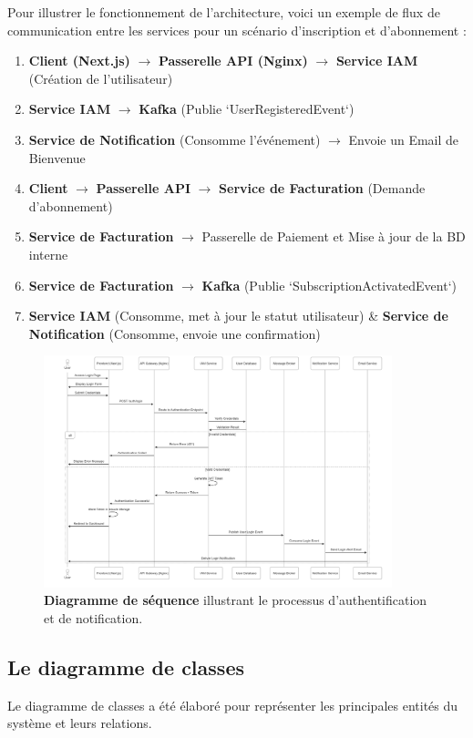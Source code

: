 Pour illustrer le fonctionnement de l'architecture, voici un exemple de flux de communication entre les services pour un scénario d'inscription et d'abonnement :
\begin{enumerate}
  \item \textbf{Client (Next.js)} $\rightarrow$ \textbf{Passerelle API (Nginx)} $\rightarrow$ \textbf{Service IAM} (Création de l'utilisateur)
  \item \textbf{Service IAM} $\rightarrow$ \textbf{Kafka} (Publie `UserRegisteredEvent`)
  \item \textbf{Service de Notification} (Consomme l'événement) $\rightarrow$ Envoie un Email de Bienvenue
  \item \textbf{Client} $\rightarrow$ \textbf{Passerelle API} $\rightarrow$ \textbf{Service de Facturation} (Demande d'abonnement)
  \item \textbf{Service de Facturation} $\rightarrow$ Passerelle de Paiement et Mise à jour de la BD interne
  \item \textbf{Service de Facturation} $\rightarrow$ \textbf{Kafka} (Publie `SubscriptionActivatedEvent`)
  \item \textbf{Service IAM} (Consomme, met à jour le statut utilisateur) \& \textbf{Service de Notification} (Consomme, envoie une confirmation)
\end{enumerate}

\begin{figure}[p]
  \centering
  \includegraphics[width=0.9\textwidth,keepaspectratio]{images/sequence_diagram.png}
  \caption{\textbf{Diagramme de séquence} illustrant le processus d'authentification et de notification.}
  \label{fig:sequence_diagram}
\end{figure}
\clearpage

\subsection{Le diagramme de classes}
Le diagramme de classes a été élaboré pour représenter les principales entités du système et leurs relations.

